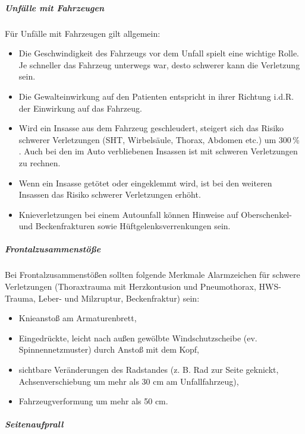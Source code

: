 \subparagraph{Unfälle mit Fahrzeugen}

Für Unfälle mit Fahrzeugen gilt allgemein:

\begin{itemize}
  \item Die Geschwindigkeit des Fahrzeugs vor dem Unfall spielt eine wichtige 
  Rolle. Je schneller das Fahrzeug unterwegs  war, desto schwerer kann die
  Verletzung sein. 
  \item Die Gewalteinwirkung auf den Patienten entspricht in ihrer Richtung 
  i.d.R. der Einwirkung auf das Fahrzeug.
  \item Wird ein Insasse aus dem Fahrzeug geschleudert,
  steigert sich das Risiko schwerer Verletzungen (SHT,
  Wirbelsäule, Thorax, Abdomen etc.) um 300\,\%
  \cite{BoehmerTaschRett6}. Auch bei
  den im Auto verbliebenen Insassen ist mit schweren Verletzungen zu rechnen.
  \item Wenn ein Insasse getötet oder eingeklemmt wird, ist bei den weiteren 
  Insassen das Risiko schwerer Verletzungen erhöht.
  \item Knieverletzungen bei einem Autounfall können Hinweise auf Oberschenkel-
  und Beckenfrakturen sowie Hüftgelenksverrenkungen sein.
\end{itemize}

\subparagraph{Frontalzusammenstöße}

Bei Frontalzusammenstößen sollten folgende Merkmale
Alarmzeichen für schwere Verletzungen (Thoraxtrauma mit  Herzkontusion und
Pneumothorax, HWS-Trauma, Leber- und Milzruptur, Beckenfraktur) sein:
\begin{itemize}
    \item Knieanstoß am Armaturenbrett,
    \item Eingedrückte, leicht nach außen gewölbte Windschutzscheibe  (ev.
    Spinnennetzmuster) durch Anstoß mit dem Kopf,
    \item sichtbare Veränderungen des Radstandes (z. B. Rad zur Seite 
    geknickt, Achsenverschiebung um mehr als 30 cm am Unfallfahrzeug),
    \item Fahrzeugverformung um mehr als 50 cm.
\end{itemize}

\subparagraph{Seitenaufprall}

